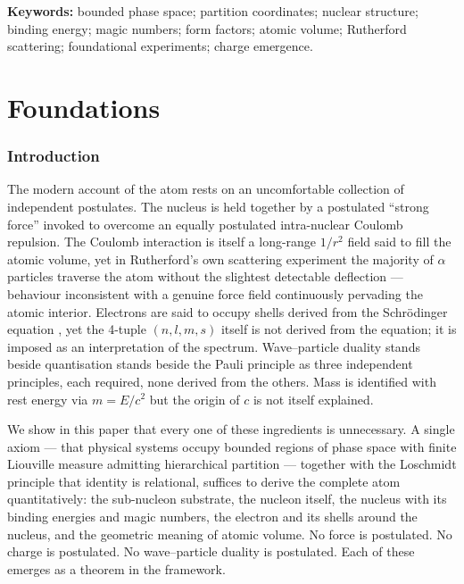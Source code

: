 \documentclass[11pt,a4paper]{article}
\theoremstyle{definition}
\theoremstyle{remark}
\begin{document}
\vspace{0.5em}
\textbf{Keywords:} bounded phase space; partition coordinates; nuclear structure; binding energy; magic numbers; form factors; atomic volume; Rutherford scattering; foundational experiments; charge emergence.

\tableofcontents

\part{Foundations}

\section{Introduction}
\label{sec:intro}

The modern account of the atom rests on an uncomfortable collection of independent postulates. The nucleus is held together by a postulated ``strong force'' invoked to overcome an equally postulated intra-nuclear Coulomb repulsion. The Coulomb interaction is itself a long-range $1/r^2$ field said to fill the atomic volume, yet in Rutherford's own scattering experiment \citep{rutherford1911} the majority of $\alpha$ particles traverse the atom without the slightest detectable deflection --- behaviour inconsistent with a genuine force field continuously pervading the atomic interior. Electrons are said to occupy shells derived from the Schr\"odinger equation \citep{schrodinger1926}, yet the 4-tuple $(n,l,m,s)$ itself is not derived from the equation; it is imposed as an interpretation of the spectrum. Wave--particle duality stands beside quantisation stands beside the Pauli principle \citep{pauli1925} as three independent principles, each required, none derived from the others. Mass is identified with rest energy via $m = E/c^2$ but the origin of $c$ is not itself explained.

We show in this paper that every one of these ingredients is unnecessary. A single axiom --- that physical systems occupy bounded regions of phase space with finite Liouville measure admitting hierarchical partition --- together with the Loschmidt principle that identity is relational, suffices to derive the complete atom quantitatively: the sub-nucleon substrate, the nucleon itself, the nucleus with its binding energies and magic numbers, the electron and its shells around the nucleus, and the geometric meaning of atomic volume. No force is postulated. No charge is postulated. No wave--particle duality is postulated. Each of these emerges as a theorem in the framework.
\end{document}
